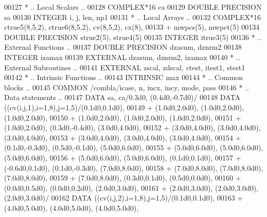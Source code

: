 \begin{DoxyCode}
00127 \textcolor{comment}{*     .. Local Scalars ..}
00128       \textcolor{keywordtype}{COMPLEX*16}        ca
00129       \textcolor{keywordtype}{DOUBLE PRECISION}  sa
00130       \textcolor{keywordtype}{INTEGER}           i, j, len, np1
00131 \textcolor{comment}{*     .. Local Arrays ..}
00132       \textcolor{keywordtype}{COMPLEX*16}        ctrue5(8,5,2), ctrue6(8,5,2), cv(8,5,2), cx(8),
00133      +                  mwpcs(5), mwpct(5)
00134       \textcolor{keywordtype}{DOUBLE PRECISION}  strue2(5), strue4(5)
00135       \textcolor{keywordtype}{INTEGER}           itrue3(5)
00136 \textcolor{comment}{*     .. External Functions ..}
00137       \textcolor{keywordtype}{DOUBLE PRECISION}  dzasum, dznrm2
00138       \textcolor{keywordtype}{INTEGER}           izamax
00139       \textcolor{keywordtype}{EXTERNAL}          dzasum, dznrm2, izamax
00140 \textcolor{comment}{*     .. External Subroutines ..}
00141       \textcolor{keywordtype}{EXTERNAL}          zscal, zdscal, ctest, itest1, stest1
00142 \textcolor{comment}{*     .. Intrinsic Functions ..}
00143       \textcolor{keywordtype}{INTRINSIC}         max
00144 \textcolor{comment}{*     .. Common blocks ..}
00145       \textcolor{keyword}{COMMON}            /combla/icase, n, incx, incy, mode, pass
00146 \textcolor{comment}{*     .. Data statements ..}
00147       \textcolor{keyword}{DATA}              sa, ca/0.3d0, (0.4d0,-0.7d0)/
00148       \textcolor{keyword}{DATA}              ((cv(i,j,1),i=1,8),j=1,5)/(0.1d0,0.1d0),
00149      +                  (1.0d0,2.0d0), (1.0d0,2.0d0), (1.0d0,2.0d0),
00150      +                  (1.0d0,2.0d0), (1.0d0,2.0d0), (1.0d0,2.0d0),
00151      +                  (1.0d0,2.0d0), (0.3d0,-0.4d0), (3.0d0,4.0d0),
00152      +                  (3.0d0,4.0d0), (3.0d0,4.0d0), (3.0d0,4.0d0),
00153      +                  (3.0d0,4.0d0), (3.0d0,4.0d0), (3.0d0,4.0d0),
00154      +                  (0.1d0,-0.3d0), (0.5d0,-0.1d0), (5.0d0,6.0d0),
00155      +                  (5.0d0,6.0d0), (5.0d0,6.0d0), (5.0d0,6.0d0),
00156      +                  (5.0d0,6.0d0), (5.0d0,6.0d0), (0.1d0,0.1d0),
00157      +                  (-0.6d0,0.1d0), (0.1d0,-0.3d0), (7.0d0,8.0d0),
00158      +                  (7.0d0,8.0d0), (7.0d0,8.0d0), (7.0d0,8.0d0),
00159      +                  (7.0d0,8.0d0), (0.3d0,0.1d0), (0.5d0,0.0d0),
00160      +                  (0.0d0,0.5d0), (0.0d0,0.2d0), (2.0d0,3.0d0),
00161      +                  (2.0d0,3.0d0), (2.0d0,3.0d0), (2.0d0,3.0d0)/
00162       \textcolor{keyword}{DATA}              ((cv(i,j,2),i=1,8),j=1,5)/(0.1d0,0.1d0),
00163      +                  (4.0d0,5.0d0), (4.0d0,5.0d0), (4.0d0,5.0d0),

\end{DoxyCode}
